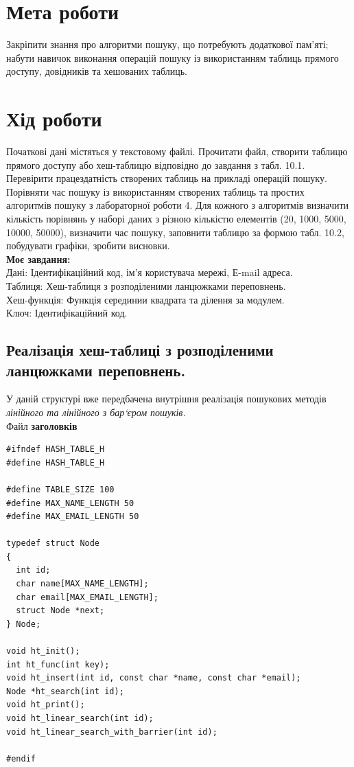 \section{Мета роботи}
Закріпити знання про алгоритми пошуку, що потребують
додаткової пам’яті; набути навичок виконання операцій пошуку із
використанням таблиць прямого доступу, довідників та хешованих таблиць.

\section{Хід роботи}
Початкові дані містяться у текстовому файлі. Прочитати файл,
створити таблицю прямого доступу або хеш-таблицю відповідно до
завдання з табл. 10.1. Перевірити працездатність створених таблиць на
прикладі операцій пошуку.\\

Порівняти час пошуку із використанням створених таблиць та простих
алгоритмів пошуку з лабораторної роботи 4. Для кожного з алгоритмів
визначити кількість порівнянь у наборі даних з різною кількістю елементів
(20, 1000, 5000, 10000, 50000), визначити час пошуку, заповнити таблицю за
формою табл. 10.2, побудувати графіки, зробити висновки.\\

\textbf{Моє завдання:} \\

Дані: Ідентифікаційний код, ім’я користувача мережі, Е-mail адреса.\\
Таблиця: Хеш-таблиця з розподіленими ланцюжками переповнень.\\
Хеш-функція: Функція серединии квадрата та ділення за модулем.\\
Ключ: Ідентифікаційний код.

\clearpage
\subsection{Реалізація хеш-таблиці з розподіленими ланцюжками переповнень.}
У даній структурі вже передбачена внутрішня реалізація пошукових методів \textit{лінійного та лінійного з бар`єром пошуків.}\\

Файл \textbf{заголовків}
\begin{lstlisting}[style=customc]
#ifndef HASH_TABLE_H
#define HASH_TABLE_H

#define TABLE_SIZE 100
#define MAX_NAME_LENGTH 50
#define MAX_EMAIL_LENGTH 50

typedef struct Node
{
  int id;
  char name[MAX_NAME_LENGTH];
  char email[MAX_EMAIL_LENGTH];
  struct Node *next;
} Node;

void ht_init();
int ht_func(int key);
void ht_insert(int id, const char *name, const char *email);
Node *ht_search(int id);
void ht_print();
void ht_linear_search(int id);
void ht_linear_search_with_barrier(int id);

#endif
\end{lstlisting}

